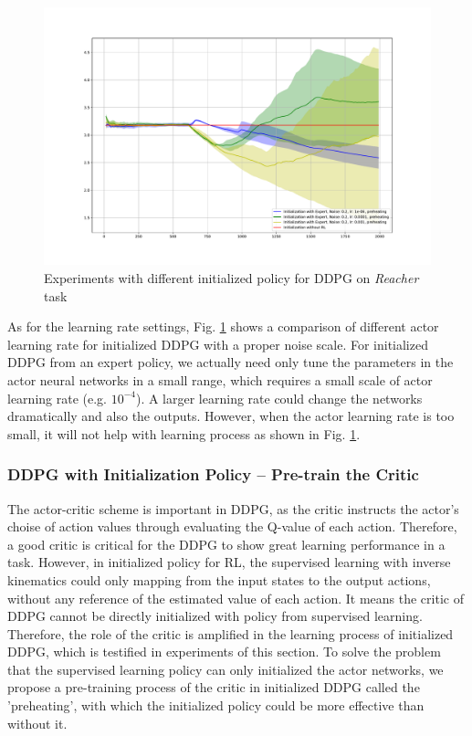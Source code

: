 \documentclass{article}
\begin{document}
\begin{figure}[htbp]
	\centering
	\includegraphics[scale=0.4]{img/ddpg_compare5.pdf}
	\caption{Experiments with different initialized policy for DDPG on \textit{Reacher} task}
	\label{fig:noise5}
\end{figure}

As for the learning rate settings, Fig. \ref{fig:noise5} shows a comparison of different actor learning rate for initialized DDPG with a proper noise scale. For initialized DDPG from an expert policy, we actually need only tune the parameters in the actor neural networks in a small range, which requires a small scale of actor learning rate (e.g. $10^{-4}$). A larger learning rate could change the networks dramatically and also the outputs. However, when the actor learning rate is too small, it will not help with learning process as shown in Fig. \ref{fig:noise5}.


\subsubsection{DDPG with Initialization Policy -- Pre-train the Critic}\label{pretrain}
The actor-critic scheme is important in DDPG, as the critic instructs the actor's choise of action values through evaluating the Q-value of each action. Therefore, a good critic is critical for the DDPG to show great learning performance in a task. However, in initialized policy for RL, the supervised learning with inverse kinematics could only mapping from the input states to the output actions, without any reference of the estimated value of each action. It means the critic of DDPG cannot be directly initialized with policy from supervised learning. Therefore, the role of the critic is amplified in the learning process of initialized DDPG, which is testified in experiments of this section. To solve the problem that the supervised learning policy can only initialized the actor networks, we propose a pre-training process of the critic in initialized DDPG called the 'preheating', with which the initialized policy could be more effective than without it.
\end{document}
